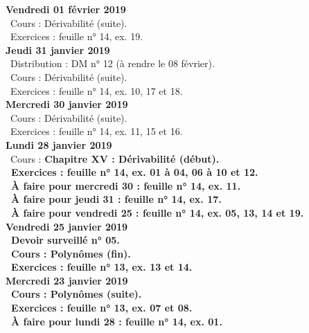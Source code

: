 \documentclass[12pt,a4paper]{article}
\begin{document}
\noindent\textbf{Vendredi 01 février 2019}\\
\bu\ Cours : Dérivabilité (suite).\\
\bu\ Exercices : feuille n° 14, ex. 19.\vspace{.4cm}\\
 
\noindent\textbf{Jeudi 31 janvier 2019}\\
\bu\ Distribution : DM n° 12 (à rendre le 08 février).\\
\bu\ Cours : Dérivabilité (suite).\\
\bu\ Exercices : feuille n° 14, ex. 10, 17 et 18.\vspace{.4cm}\\
 
\noindent\textbf{Mercredi 30 janvier 2019} \\
\bu\ Cours : Dérivabilité (suite).\\
\bu\ Exercices : feuille n° 14, ex. 11, 15 et 16.\vspace{.4cm}\\
 
\noindent\textbf{Lundi 28 janvier 2019} \\
\bu\ Cours : \bf Chapitre XV \rm : Dérivabilité (début).\\
\bu\ Exercices : feuille n° 14, ex. 01 à 04, 06 à 10 et 12.\\
\bu\ À faire pour mercredi 30 : feuille n° 14, ex. 11.\\
\bu\ À faire pour jeudi 31 : feuille n° 14, ex. 17.\\
\bu\ À faire pour vendredi 25 : feuille n° 14, ex. 05, 13, 14 et 19.\vspace{.4cm}\\
 
\noindent\textbf{Vendredi 25 janvier 2019}\\
\bu\ Devoir surveillé n° 05.\\
\bu\ Cours : Polynômes (fin).\\
\bu\ Exercices : feuille n° 13, ex. 13 et 14.\vspace{.4cm}\\

\noindent\textbf{Mercredi 23 janvier 2019} \\
\bu\ Cours : Polynômes (suite).\\
\bu\ Exercices : feuille n° 13, ex. 07 et 08.\\
\bu\ À faire pour lundi 28 : feuille n° 14, ex. 01.\vspace{.4cm}\\
 
\end{document}
